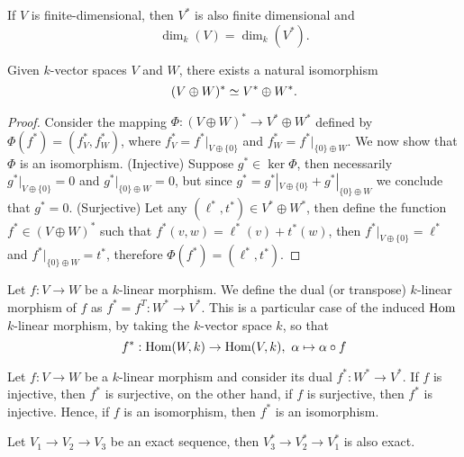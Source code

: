 \begin{proposition}
  If \(V\) is finite-dimensional, then \(V^\ast\) is also finite dimensional and 
  \[
    \dim_k(V) = \dim_k (V^\ast).
  \] 
\end{proposition}

\begin{proposition}
  Given \(k\)-vector spaces \(V\) and \(W\), there exists a natural isomorphism
  \[
    (V \oplus W)^\ast \simeq V^\ast \oplus W^\ast.
  \] 
\end{proposition}

\begin{proof}
  Consider the mapping \(\Phi: (V \oplus W)^\ast \to V^\ast \oplus W^\ast\)
  defined by \(\Phi(f^\ast) = (f^\ast_V, f^\ast_W)\), where \(f^\ast_V =
  f^\ast|_{V \oplus \{0\}} \) and \(f^\ast_W = f^\ast|_{\{0\} \oplus W}\). We
  now show that \(\Phi\) is an isomorphism. (Injective) Suppose \(g^\ast \in
  \ker \Phi\), then necessarily \(g^\ast|_{V\oplus \{0\}} = 0\) and
  \(g^\ast|_{\{0\} \oplus W} = 0\), but since \(g^\ast = g^\ast|_{V\oplus
  \{0\}} + g^\ast|_{\{0\} \oplus W}\) we conclude that \(g^\ast = 0\).
  (Surjective) Let any \((\ell^\ast, t^\ast) \in V^\ast \oplus W^\ast\), then
  define the function \(f^\ast \in (V \oplus W)^\ast\) such that \(f^\ast(v, w)
  = \ell^\ast(v) + t^\ast(w)\), then \(f^\ast|_{V \oplus \{0\}} = \ell^\ast\)
  and \(f^\ast|_{\{0\} \oplus W} = t^\ast\), therefore \(\Phi(f^\ast) =
  (\ell^\ast, t^\ast)\).
\end{proof}

\begin{definition}
  Let \(f : V \to W\) be a \(k\)-linear morphism. We define the dual (or
  transpose) \(k\)-linear morphism of \(f\) as \(f^\ast = f^T : W^\ast \to
  V^\ast\). This is a particular case of the induced \(\operatorname{Hom}\) \(k\)-linear
  morphism, by taking the \(k\)-vector space \(k\), so that 
  \[
    f^\ast : \operatorname{Hom}(W, k) \to \operatorname{Hom}(V, k),\ \alpha \mapsto \alpha \circ f
  \] 
\end{definition}

\begin{proposition}
  Let \(f : V \to W\) be a \(k\)-linear morphism and consider its dual \(f^\ast
  : W^\ast \to V^\ast\). If \(f\) is injective, then \(f^\ast\) is surjective,
  on the other hand, if \(f\) is surjective, then \(f^\ast\) is injective.
  Hence, if \(f\) is an isomorphism, then \(f^*\) is an isomorphism.
\end{proposition}

\begin{proposition}
  Let \(V_1 \to V_2 \to V_3\) be an exact sequence, then \(V_3^\ast \to
  V_2^\ast \to V_1^\ast\) is also exact.
\end{proposition}

